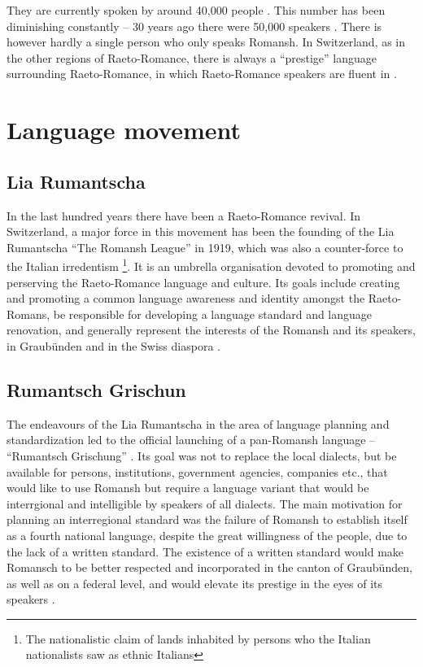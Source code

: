 They are currently spoken by around 40,000 people \autocite{bundesamt2020}. 
This number has been diminishing constantly -- 30 years ago there were 50,000 speakers \autocite{haiman1992}. 
There is however hardly a single person who only speaks Romansh. 
In Switzerland, as in the other regions of Raeto-Romance, there is always a \enquote{prestige} language surrounding Raeto-Romance, in which Raeto-Romance speakers are fluent in \autocite[3]{haiman1992}. 

\section{Language movement}
\subsection{Lia Rumantscha}
In the last hundred years there have been a Raeto-Romance revival. 
In Switzerland, a major force in this movement has been the founding of the Lia Rumantscha \enquote{The Romansh League} in 1919, which was also a counter-force to the Italian irredentism \footnote{The nationalistic claim of lands inhabited by persons who the Italian nationalists saw as ethnic Italians}. 
It is an umbrella organisation devoted to promoting and perserving the Raeto-Romance language and culture. Its goals include creating and promoting a common language awareness and identity amongst the Raeto-Romans, be responsible for developing a language standard and language renovation, and generally represent the interests of the Romansh and its speakers, in Graubünden and in the Swiss diaspora \autocite{dazzi2012}.

\subsection{Rumantsch Grischun}
The endeavours of the Lia Rumantscha in the area of language planning and standardization led to the official launching of a pan-Romansh language -- \enquote{Rumantsch Grischung} \autocite[5]{haiman1992}. 
Its goal was not to replace the local dialects, but be available for persons, institutions, government agencies, companies etc., that would like to use Romansh but require a language variant that would be interrgional and intelligible by speakers of all dialects. The main motivation for planning an interregional standard was the failure of Romansh to establish itself as a fourth national language, despite the great willingness of the people, due to the lack of a written standard. 
The existence of a written standard would make Romansch to be better respected and incorporated in the canton of Graubünden, as well as on a federal level, and would elevate its prestige in the eyes of its speakers \autocite{schmid1982}.

